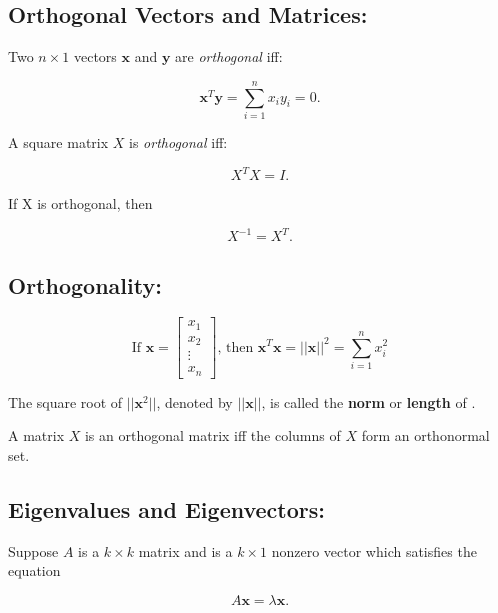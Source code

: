 \documentclass[12pt]{article}
\begin{document}
\subsection{Orthogonal Vectors and Matrices:}
Two $n\times 1$ vectors $\mathbf{x}$ and $\mathbf{y}$ are \textit{orthogonal} iff:

\begin{equation}
    \mathbf{x}^T\mathbf{y} = \sum^{n}_{i=1}x_iy_i = 0.
\end{equation}

A square matrix $X$ is \textit{orthogonal} iff:

\begin{equation}
    X^TX = I.
\end{equation}

If X is orthogonal, then

\begin{equation}
    X^{-1} = X^T.
\end{equation}

\subsection{Orthogonality:}

\begin{equation}
    \textrm{If } \mathbf{x} = \begin{bmatrix} x_1 \\ x_2 \\ \vdots \\ x_n \end{bmatrix}\textrm{, then }\mathbf{x}^T\mathbf{x} = ||\mathbf{x}||^2 = \sum^n_{i=1}x^2_i
\end{equation}

The square root of $||\mathbf{x}^2||$, denoted by $||\mathbf{x}||$, is called the \textbf{norm} or \textbf{length} of .

A matrix $X$ is an orthogonal matrix iff the columns of $X$ form an orthonormal set.

\subsection{Eigenvalues and Eigenvectors:}

Suppose $A$ is a $k\times k$ matrix and  is a $k\times 1$ nonzero vector which satisfies the equation

\begin{equation}
    A\mathbf{x} = \lambda\mathbf{x}.
\end{equation}
\end{document}
